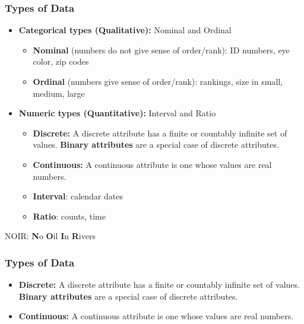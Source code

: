 \begin{frame}[fragile]\frametitle{Types of Data}	

	\begin{itemize}
	\item {\bf Categorical types (Qualitative):} Nominal and Ordinal
		\begin{itemize}
	\item {\bf Nominal} (numbers do not give sense of order/rank): ID numbers, eye color, zip codes
	\item {\bf Ordinal} (numbers give sense of order/rank): rankings, size in {small, medium, large}
		\end{itemize}
	\item {\bf Numeric types (Quantitative):} Interval and Ratio
			\begin{itemize}

		\item {\bf Discrete:} A discrete attribute has a finite or countably infinite
		set of values. {\bf Binary attributes} are a special case of discrete attributes. 
		\item {\bf Continuous:} A continuous attribute is one whose values are real numbers.
	
	\item {\bf Interval}: calendar dates
	\item {\bf Ratio}: counts, time
			\end{itemize}
	\end{itemize}
NOIR: {\bf N}o {\bf O}il {\bf I}n {\bf R}ivers
\end{frame}

\begin{frame}[fragile]\frametitle{Types of Data}	

\begin{itemize}
		\item {\bf Discrete:} A discrete attribute has a finite or countably infinite
		set of values. {\bf Binary attributes} are a special case of discrete attributes. 
		\item {\bf Continuous:} A continuous attribute is one whose values are real numbers.
\end{itemize}
\end{frame}

